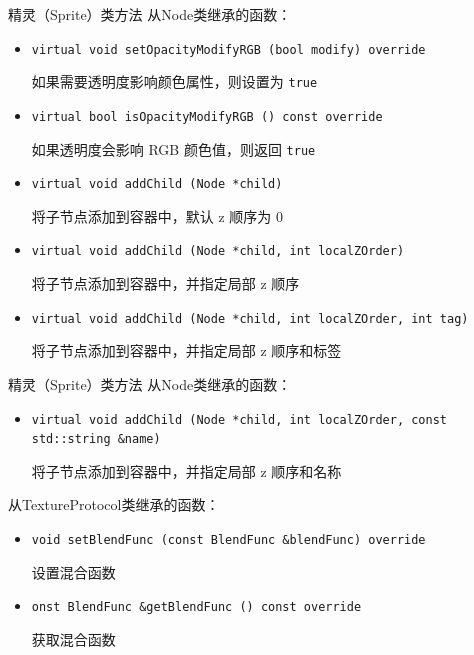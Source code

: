 \documentclass{beamer}
\begin{document}

\begin{frame}[fragile]{精灵（Sprite）类方法}
从Node类继承的函数：
\begin{itemize}
\item \texttt{virtual void setOpacityModifyRGB (bool modify) override}

如果需要透明度影响颜色属性，则设置为 \texttt{true}
\item \texttt{virtual bool isOpacityModifyRGB () const override}

如果透明度会影响 RGB 颜色值，则返回 \texttt{true}
\item \texttt{virtual void addChild (Node *child)}

将子节点添加到容器中，默认 z 顺序为 0
\item \texttt{virtual void addChild (Node *child, int localZOrder)}

将子节点添加到容器中，并指定局部 z 顺序
\item \texttt{virtual void addChild (Node *child, int localZOrder, int tag)}

将子节点添加到容器中，并指定局部 z 顺序和标签
\end{itemize}
\end{frame}


\begin{frame}[fragile]{精灵（Sprite）类方法}
从Node类继承的函数：
\begin{itemize}
\item \texttt{virtual void addChild (Node *child, int localZOrder, const std::string \&name)}

将子节点添加到容器中，并指定局部 z 顺序和名称
\end{itemize}
从TextureProtocol类继承的函数：
\begin{itemize}
\item \texttt{void setBlendFunc (const BlendFunc \&blendFunc) override}

设置混合函数
\item \texttt{onst BlendFunc \&getBlendFunc () const override}

获取混合函数
\end{itemize}
\end{frame}

\end{document}
